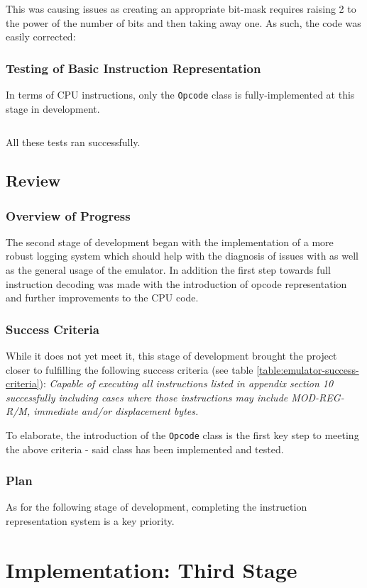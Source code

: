         This was causing issues as creating an appropriate bit-mask requires raising 2 to the power of the number of bits and then taking away one. As such, the code was easily corrected: 


    \subsubsection{Testing of Basic Instruction Representation}
        In terms of CPU instructions, only the \texttt{Opcode} class is fully-implemented at this stage in development.

        \inputminted{c++}{code/second/testinstructions.cpp}

        All these tests ran successfully.

\subsection{Review}
    \subsubsection{Overview of Progress}
        The second stage of development began with the implementation of a more robust logging system which should help with the diagnosis of issues with as well as the general usage of the emulator. In addition the first step towards full instruction decoding was made with the introduction of opcode representation and further improvements to the CPU code.

    \subsubsection{Success Criteria}
        While it does not yet meet it, this stage of development brought the project closer to fulfilling the following success criteria (see table \ref{table:emulator-success-criteria}): \textit{Capable of executing all instructions listed in appendix section 10 successfully including cases where those instructions may include MOD-REG-R/M, immediate and/or displacement bytes.}

        To elaborate, the introduction of the \texttt{Opcode} class is the first key step to meeting the above criteria - said class has been implemented and tested.

    \subsubsection{Plan}
        As for the following stage of development, completing the instruction representation system is a key priority.



\section{Implementation: Third Stage}
